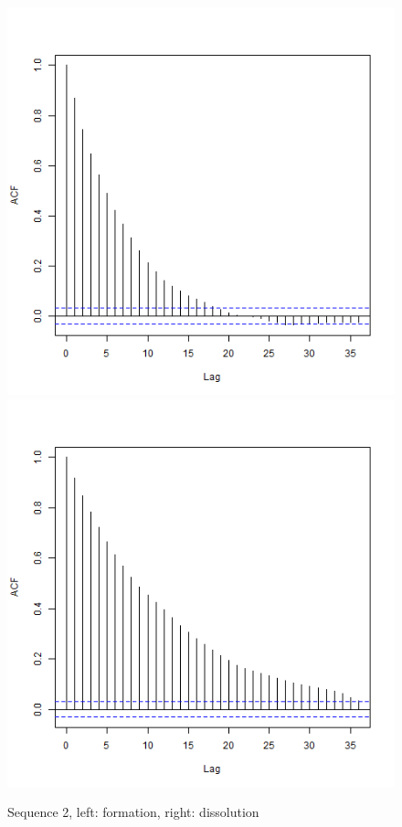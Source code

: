 \documentclass[aspectratio=169,ignorenonframetext,9pt]{beamer}
\theoremstyle{plain}
\theoremstyle{definition}
\begin{document}
\begin{figure}[h]
\begin{center}
        \includegraphics[scale=0.23]{pictures/net2seq_chain1_BSTERGM_formation_acf.png}
        \includegraphics[scale=0.23]{pictures/net2seq_chain1_BSTERGM_dissolution_acf.png}
    \caption{Sequence 2, left: formation, right: dissolution}
    \end{center}
\end{figure}
\end{document}
